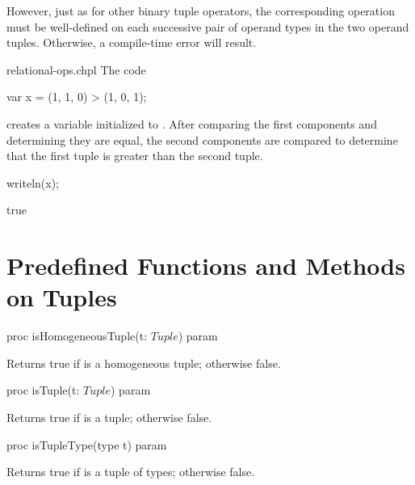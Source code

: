 However, just as for other binary tuple operators, the corresponding operation
must be well-defined on each successive pair of operand types in the two operand
tuples.  Otherwise, a compile-time error will result.

\begin{chapelexample}{relational-ops.chpl}
The code
\begin{chapel}
var x = (1, 1, 0) > (1, 0, 1);
\end{chapel}
creates a variable initialized to .  After comparing the
first components and determining they are equal, the second components
are compared to determine that the first tuple is greater than the
second tuple.
\begin{chapelpost}
writeln(x);
\end{chapelpost}
\begin{chapeloutput}
true
\end{chapeloutput}
\end{chapelexample}

\section{Predefined Functions and Methods on Tuples}
\label{Predefined_Functions_and_Methods_on_Tuples}

\begin{protohead}
proc isHomogeneousTuple(t: $Tuple$) param
\end{protohead}
\begin{protobody}
Returns true if  is a homogeneous tuple; otherwise false.
\end{protobody}

\begin{protohead}
proc isTuple(t: $Tuple$) param
\end{protohead}
\begin{protobody}
Returns true if  is a tuple; otherwise false.
\end{protobody}

\begin{protohead}
proc isTupleType(type t) param
\end{protohead}
\begin{protobody}
Returns true if  is a tuple of types; otherwise false.
\end{protobody}

